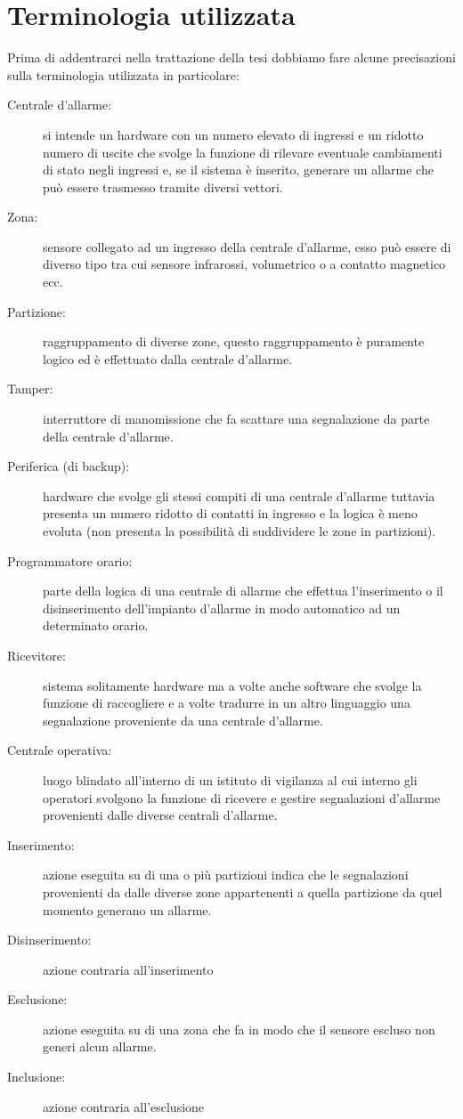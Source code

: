 \section{Terminologia utilizzata}
Prima di addentrarci nella trattazione della tesi dobbiamo fare alcune precisazioni sulla terminologia utilizzata in particolare:
\begin{description}
	\item[Centrale d'allarme:] si intende un hardware con un numero elevato di ingressi e un ridotto numero di uscite che svolge la funzione di rilevare eventuale cambiamenti di stato negli ingressi e, se il sistema è inserito, generare un allarme che può essere trasmesso tramite diversi vettori.
	\item[Zona:] sensore collegato ad un ingresso della centrale d'allarme, esso può essere di diverso tipo tra cui sensore infrarossi, volumetrico o a contatto magnetico ecc.
	\item[Partizione:] raggruppamento di diverse zone, questo raggruppamento è puramente logico ed è effettuato dalla centrale d'allarme.
	\item[Tamper:] interruttore di manomissione che fa scattare una segnalazione da parte della centrale d'allarme.
	\item[Periferica (di backup):] hardware che svolge gli stessi compiti di una centrale d'allarme tuttavia presenta un numero ridotto di contatti in ingresso e la logica è meno evoluta (non presenta la possibilità di suddividere le zone in partizioni).
	\item[Programmatore orario:] parte della logica di una centrale di allarme che effettua l'inserimento o il disinserimento dell'impianto d'allarme in modo automatico ad un determinato orario.
	\item[Ricevitore: ] sistema solitamente hardware ma a volte anche software che svolge la funzione di raccogliere e a volte tradurre in un altro linguaggio una segnalazione proveniente da una centrale d'allarme.
	\item[Centrale operativa:] luogo blindato all'interno di un istituto di vigilanza al cui interno gli operatori svolgono la funzione di ricevere e gestire segnalazioni d'allarme provenienti dalle diverse centrali d'allarme.
	\item[Inserimento:] azione eseguita su di una o più partizioni indica che le segnalazioni provenienti da dalle diverse zone appartenenti a quella partizione da quel momento generano un allarme.
	\item[Disinserimento:] azione contraria all'inserimento
	\item[Esclusione:] azione eseguita su di una zona che fa in modo che il sensore escluso non generi alcun allarme.
	\item[Inclusione:] azione contraria all'esclusione
\end{description}
